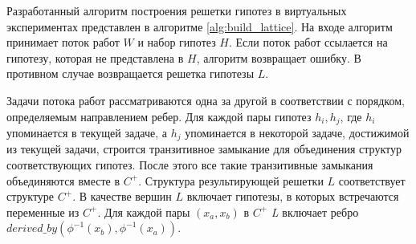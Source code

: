 Разработанный алгоритм построения решетки гипотез в виртуальных экспериментах представлен в алгоритме
\ref{alg:build_lattice}. На входе алгоритм принимает поток работ $W$ и набор гипотез $H$. 
Если поток работ ссылается на гипотезу, которая не представлена в $H$, алгоритм возвращает ошибку. 
В противном случае возвращается решетка гипотезы $L$.  

Задачи потока работ рассматриваются одна за другой в соответствии с порядком, определяемым направлением ребер. 
Для каждой пары гипотез $h_i, h_j$, где $h_i$ упоминается в текущей задаче, а $h_j$ упоминается в некоторой задаче, 
достижимой из текущей задачи, строится транзитивное замыкание для объединения структур соответствующих гипотез. 
После этого все такие транзитивные замыкания объединяются вместе в $C^+$. Структура результирующей решетки $L$ 
соответствует структуре $C^+$. В качестве вершин $L$ включает гипотезы, в которых встречаются переменные из $C^+$. 
Для каждой пары $\left(x_a, x_b\right)$ в $C^+$ \textit{L} включает ребро 
$derived\_by \left(\phi^{-1}\left(x_b\right), \phi^{-1}\left(x_a\right)\right)$.

